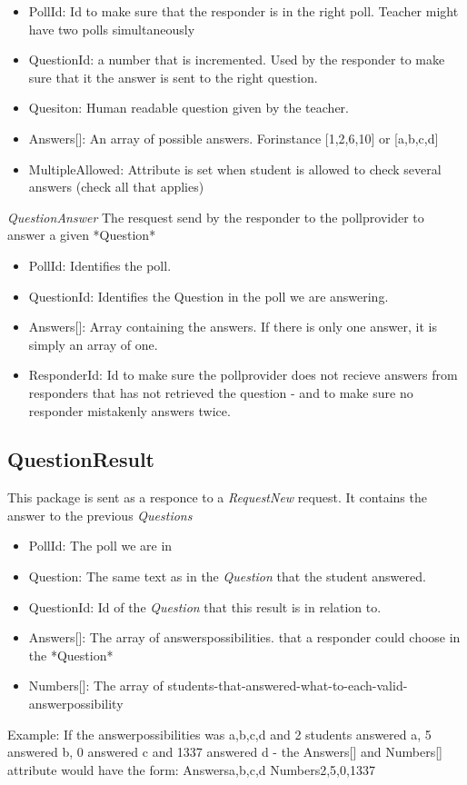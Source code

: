 \documentclass{acm_proc_article-sp}
\begin{document}
\begin{itemize}
\item PollId: Id to make sure that the responder is in the right poll. Teacher might have two polls simultaneously
\item  QuestionId: a number that is incremented. Used by the responder to make sure that it the answer is sent to the right question.
\item  Quesiton: Human readable question given by the teacher.
\item  Answers[]: An array of possible answers. Forinstance [1,2,6,10] or [a,b,c,d]
\item MultipleAllowed: Attribute is set when student is allowed to check several answers (check all that applies)
\end{itemize}

\emph{QuestionAnswer}
The resquest send by the responder to the pollprovider to answer a given *Question*
\begin{itemize}
\item PollId: Identifies the poll.
\item QuestionId: Identifies the Question in the poll we are answering.
\item Answers[]: Array containing the answers. If there is only one answer, it is simply an array of one.
\item ResponderId: Id to make sure the pollprovider does not recieve answers from responders that has not retrieved the question - and to make sure no responder mistakenly answers twice.
\end{itemize}


\subsection{QuestionResult}
This package is sent as a responce to a \emph{RequestNew} request. It contains the answer to the previous \emph{Questions}

\begin{itemize}
\item PollId: The poll we are in
\item Question: The same text as in the \emph{Question} that the student answered.
\item QuestionId: Id of the \emph{Question} that this result is in relation to.
\item Answers[]: The array of answerspossibilities. that a responder could choose in the *Question*
\item Numbers[]: The array of students-that-answered-what-to-each-valid-answerpossibility
\end{itemize} 
Example: If the answerpossibilities was {a,b,c,d} and
2 students answered a, 5 answered b, 0 answered c and 1337 answered d - the Answers[] and Numbers[] attribute would have the form:
Answers{a,b,c,d}
Numbers{2,5,0,1337}
 
\end{document}
